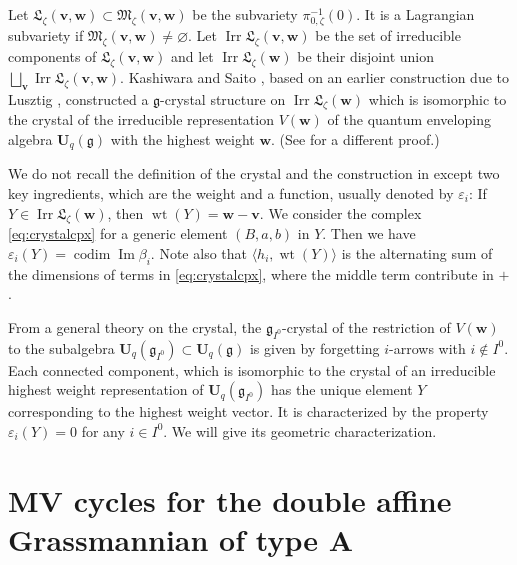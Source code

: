 \documentclass[10pt,a4paper]{amsart}
\theoremstyle{definition}
\numberwithin{equation}{section}
\newcommand{\defeq}{\overset{\operatorname{\scriptstyle def}}{=}}
\newcommand{\g}{{\mathfrak g}}
\newcommand{\Ima}{\operatorname{Im}}
\newcommand{\vin}[1]{\operatorname{i}(#1)} %
\newcommand{\M}{{\mathfrak M}} %
\newcommand{\La}{{\mathfrak L}} %
\newcommand{\bv}{{\mathbf v}} %
\newcommand{\bw}{{\mathbf w}} %
\newcommand{\codim}{\operatorname{codim}} %
\newcommand{\Uq}{{\mathbf U}_q(\mathfrak g)} %
\newcommand{\Un}{{\mathbf U}_q}
\newcommand{\Irr}{\operatorname{Irr}}
\begin{document}
Let $\La_\zeta(\bv,\bw)\subset\M_\zeta(\bv,\bw)$ be the subvariety
$\pi_{0,\zeta}^{-1}(0)$. It is a Lagrangian subvariety
\cite[5.8]{Na-quiver} if $\M_\zeta(\bv,\bw)\neq\varnothing$. Let
$\Irr\La_\zeta(\bv,\bw)$ be the set of irreducible components of
$\La_\zeta(\bv,\bw)$ and let $\Irr\La_\zeta(\bw)$ be their disjoint
union $\bigsqcup_\bv \Irr\La_\zeta(\bv,\bw)$.
%
Kashiwara and Saito \cite{KS,Saito}, based on an earlier construction
due to Lusztig \cite{Lu-crystal}, constructed a $\mathfrak g$-crystal
structure on $\Irr\La_\zeta(\bw)$ which is isomorphic to the crystal of the
irreducible representation $V(\bw)$ of the quantum enveloping algebra
$\Uq$ with the highest weight $\bw$. (See \cite{Na-tensor} for a
dif\/ferent proof.)

We do not recall the def\/inition of the crystal and the construction in
\cite{KS,Saito} except two key ingredients, which are the weight and
a function, usually denoted by $\varepsilon_i$: If
$Y\in\Irr\La_\zeta(\bw)$, then
\(
  \operatorname{wt}(Y) = \bw - \bv.
\)
We consider the complex \eqref{eq:crystalcpx}
for a generic element $(B,a,b)$ in $Y$. Then we have
$\varepsilon_i(Y) = \codim \Ima\beta_i$. Note also that
$\langle h_i, \operatorname{wt}(Y)\rangle$ is the alternating sum of
the dimensions of terms in \eqref{eq:crystalcpx}, where the middle
term contribute in $+$.

From a general theory on the crystal, the $\g_{I^0}$-crystal of the
restriction of $V(\bw)$ to the subalgebra $\Un(\g_{I^0})\subset \Uq$
is given by forgetting $i$-arrows with $i\notin I^0$. Each connected
component, which is isomorphic to the crystal of an irreducible
highest weight representation of $\Un(\g_{I^0})$ has the unique
element $Y$ corresponding to the highest weight vector. It is
characterized by the property $\varepsilon_i(Y) = 0$ for any $i\in
I^0$. We will give its geometric characterization.

\section[MV cycles for the double affine Grassmannian of type
  $A$]{MV cycles for the double af\/f\/ine Grassmannian of type
  $\boldsymbol{A}$}\label{sec:MV}
\end{document}
